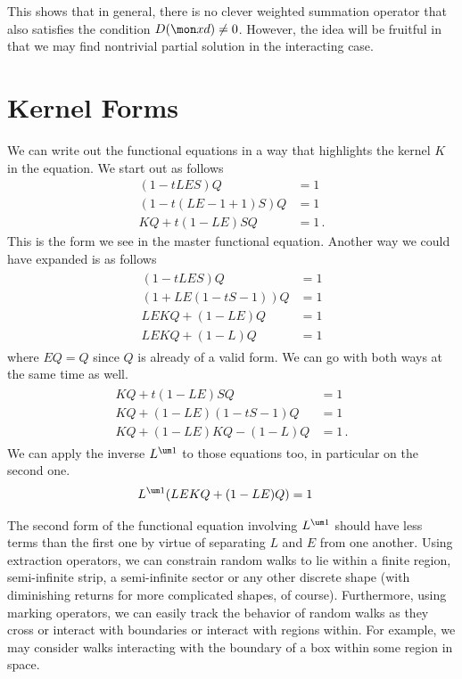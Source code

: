 This shows that in general, there is no clever weighted summation operator that also satisfies the condition $D(\mon xd) \neq 0$. However, the idea will be fruitful in that we may find nontrivial partial solution in the interacting case.
\section{Kernel Forms}
We can write out the functional equations in a way that highlights the kernel $K$ in the equation. We start out as follows
\begin{align}
	(1-tLES)Q &= 1\\
	(1-t(LE-1+1)S)Q &=1\\
	KQ + t(1-LE)SQ &= 1\,.
\end{align}
This is the form we see in the master functional equation. Another way we could have expanded is as follows
\begin{align}
\begin{split}
	(1-tLES)Q &= 1\\
	(1+LE(1-tS-1))Q &= 1\\
	LEKQ+(1-LE)Q &= 1\\
	LEKQ+(1-L)Q &= 1
\end{split}	
\end{align}
where $EQ = Q$ since $Q$ is already of a valid form. We can go with both ways at the same time as well.
\begin{align}\begin{split}
	KQ + t(1-LE)SQ &= 1\\
	KQ + (1-LE)(1-tS-1)Q &=1\\
	KQ + (1-LE)KQ - (1-L)Q &= 1\,.
\end{split}\end{align}
We can apply the inverse $L^{\um 1}$ to those equations too, in particular on the second one.
\begin{align}
\begin{split}
	L^{\um 1}(LEKQ+(1-LE)Q) &= 1
\end{split}	
\end{align}

The second form of the functional equation involving $L^{\um 1}$ should have less terms than the first one by virtue of separating $L$ and $E$ from one another. Using extraction operators, we can constrain random walks to lie within a finite region, semi-infinite strip, a semi-infinite sector or any other discrete shape (with diminishing returns for more complicated shapes, of course). Furthermore, using marking operators, we can easily track the behavior of random walks as they cross or interact with boundaries or interact with regions within. For example, we may consider walks interacting with the boundary of a box within some region in space. 

